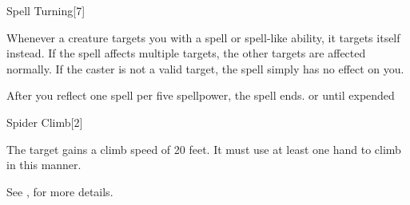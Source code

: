 \begin{spellsection}{Spell Turning}[7]
    \begin{spellheader}
    \end{spellheader}
    \begin{spellcontent}
        \begin{spelltargetinginfo}
        \end{spelltargetinginfo}
        \begin{spelleffects}
            \spelleffect Whenever a creature targets you with a spell or spell-like ability, it targets itself instead. If the spell affects multiple targets, the other targets are affected normally. If the caster is not a valid target, the spell simply has no effect on you.

            After you reflect one spell per five spellpower, the spell ends.
            \spelldur \durlong or until expended
        \end{spelleffects}
    \end{spellcontent}
    \begin{spellfooter}
        \miscastexplode
    \end{spellfooter}
\end{spellsection}

\begin{spellsection}{Spider Climb}[2]
    \begin{spellheader}
    \end{spellheader}
    \begin{spellcontent}
        \begin{spelltargetinginfo}
        \end{spelltargetinginfo}
        \begin{spelleffects}
            \spelleffect The target gains a climb speed of 20 feet. It must use at least one hand to climb in this manner.
            \spelldur \durmed
        \end{spelleffects}
    \end{spellcontent}
    \begin{spellfooter}
        \spellnotes See , for more details.
        \miscastexplode
    \end{spellfooter}
\end{spellsection}

